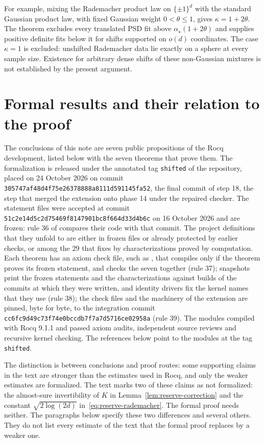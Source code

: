 \documentclass[11pt]{article}
\theoremstyle{remark}
\begin{document}
For example, mixing the Rademacher product law on $\{\pm1\}^d$ with
the standard Gaussian product law, with fixed Gaussian weight $0<\theta\le1$,
gives $\kappa=1+2\theta$. The theorem excludes every translated PSD
fit above $\alpha_\star(1+2\theta)$ and supplies positive definite fits
below it for shifts supported on $o(d)$ coordinates. The case
$\kappa=1$ is excluded: unshifted Rademacher data lie exactly on a
sphere at every sample size. Existence for arbitrary dense shifts of
these non-Gaussian mixtures is not established by the present argument.

\appendix
\section{Formal results and their relation to the proof}
\label{app:sources}
\begingroup\raggedright\setlength{\parindent}{17pt}

The conclusions of this note are seven public propositions of the Rocq
development, listed below with the seven theorems that prove them. The
formalization is released under the annotated tag \texttt{shifted} of
the repository, placed on 24 October 2026 on commit
\texttt{305747af48d4f75e26378888a8111d591145fa52}, the final commit of
step 18, the step that merged the extension onto phase 14 under the
repaired checker. The statement files were accepted at commit
\texttt{51c2e14d5c2d75469f8147901bc8f664d33d4b6c} on 16 October 2026
and are frozen: rule 36 of  compares
their code with that commit. The project definitions that they unfold
to are either in frozen files or already protected by earlier checks,
or among the 29 that  fixes by
characterizations proved by computation. Each theorem has an axiom
check file, such as , that
compiles only if the theorem proves its frozen statement, and
 checks the seven together (rule 37);
snapshots print the frozen statements and the characterizations
against builds of the commits at which they were written, and identity
drivers fix the kernel names that they use (rule 38); the check files
and the machinery of the extension are pinned, byte for byte, to the
integration commit \texttt{cc6fc9d49c73f74e0bccdb7f7a7d5716ce02958a}
(rule 39). The modules compiled with Rocq 9.1.1 and passed axiom
audits, independent source reviews and recursive kernel checking. The
references below point to the modules at the tag \texttt{shifted}.

The distinction is between conclusions and proof routes: some supporting
claims in the text are stronger than the estimates used in Rocq, and
only the weaker estimates are formalized. The text marks two of these
claims as not formalized: the almost-sure invertibility of $K$ in
Lemma~\ref{lem:reserve-correction} and the constant $\sqrt{2\log(2d)}$
in~\eqref{eq:reserve-rademacher}. The formal proof needs neither. The
paragraphs below specify these two differences and several others. They
do not list every estimate of the text that the formal proof replaces
by a weaker one.
\end{document}
